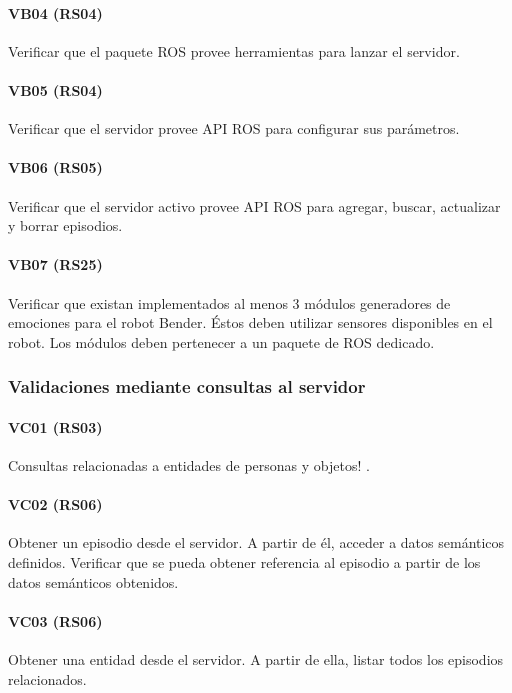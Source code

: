 \paragraph{VB04 (RS04)}
Verificar que el paquete ROS provee herramientas para lanzar el servidor.

\paragraph{VB05 (RS04)}
Verificar que el servidor provee API ROS para configurar sus parámetros.

\paragraph{VB06 (RS05)}
Verificar que el servidor activo provee API ROS para agregar, buscar, actualizar y borrar episodios. 

\paragraph{VB07 (RS25)}
Verificar que existan implementados al menos 3 módulos generadores de emociones para el robot Bender. Éstos deben utilizar sensores disponibles en el robot. Los módulos deben pertenecer a un paquete de ROS dedicado.


\subsubsection{Validaciones mediante consultas al servidor}

\paragraph{VC01 (RS03)}
Consultas relacionadas a entidades de personas y objetos!
.


\paragraph{VC02 (RS06)}
Obtener un episodio desde el servidor. A partir de él, acceder a datos semánticos definidos. Verificar que se pueda obtener referencia al episodio a partir de los datos semánticos obtenidos.

\paragraph{VC03 (RS06)}
Obtener una entidad desde el servidor. A partir de ella, listar todos los episodios relacionados.

